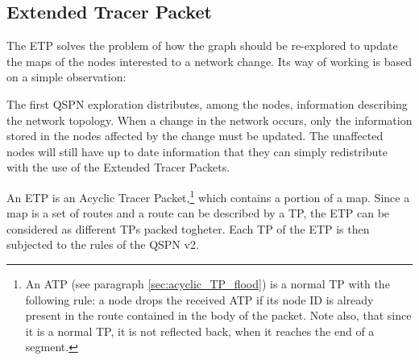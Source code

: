 \documentclass[a4paper]{article}
\begin{document}
\subsection{Extended Tracer Packet}
\label{sec:etp}
The ETP solves the problem of how the graph should be re-explored to
update the maps of the nodes interested to a network change.
Its way of working is based on a simple observation:

The first QSPN exploration distributes, among the nodes, information describing
the network topology. 
When a change in the network occurs, only
the information stored in the nodes affected by the change must be updated.
The unaffected nodes will still have up to date information that they can simply
redistribute with the use of the Extended Tracer Packets.

An ETP is an Acyclic Tracer Packet,\footnote{
An ATP (see paragraph \ref{sec:acyclic_TP_flood}) is a normal TP with the following
rule: a node drops the received ATP if  its  node ID is already present in the route
contained in the body of the packet. Note also, that since it is a normal TP,
it is not reflected back, when it reaches the end of a segment.}
which contains a portion of a map. Since a map is a set of routes and a
route can be described by a TP, the ETP can be considered as different TPs packed togheter.
Each TP of the ETP is then subjected to the rules of the QSPN v2.
\end{document}
